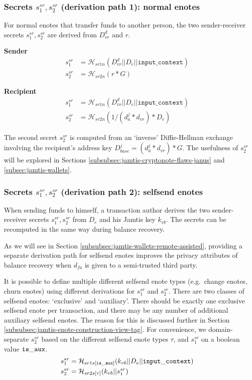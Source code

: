 \subsubsection{Secrets $s^{sr}_1, s^{sr}_2$ (derivation path 1): normal enotes}
\label{subsubsec:jamtis-srsecret-derivation-normal}

For normal enotes that transfer funds to another person, the two sender-receiver secrets $s^{sr}_1, s^{sr}_2$ are derived from $D^d_{vr}$ and $r$.

\textbf{Sender}
\begin{align*}
    s^{sr}_1 &= \mathcal{H}_{sr1n}(D^d_{vr} || D_e || \texttt{input\_context}) \\
    s^{sr}_2 &= \mathcal{H}_{sr2n}(r * G)
\end{align*}

\textbf{Recipient}
\begin{align*}
    s^{sr}_1 &= \mathcal{H}_{sr1n}(D^d_{vr} || D_e || \texttt{input\_context}) \\
    s^{sr}_2 &= \mathcal{H}_{sr2n}(1/(d^j_a * d_{vr}) * D_e)
\end{align*}

The second secret $s^{sr}_2$ is computed from an `inverse' Diffie-Hellman exchange involving the recipient's address key $D^j_{base} = (d^j_a * d_{vr}) * G$. The usefulness of $s^{sr}_2$ will be explored in Sections \ref{subsubsec:jamtis-cryptonote-flaws-janus} and \ref{subsec:jamtis-wallets}.

\subsubsection{Secrets $s^{sr}_1, s^{sr}_2$ (derivation path 2): selfsend enotes}
\label{subsubsec:jamtis-srsecret-derivation-selfsend}

When sending funds to himself, a transaction author derives the two sender-receiver secrets $s^{sr}_1, s^{sr}_2$ from $D_e$ and his Jamtis key $k_{vb}$. The secrets can be recomputed in the same way during balance recovery.

As we will see in Section \ref{subsubsec:jamtis-wallets-remote-assisted}, providing a separate derivation path for selfsend enotes improves the privacy attributes of balance recovery when $d_{fa}$ is given to a semi-trusted third party.

It is possible to define multiple different selfsend enote types (e.g.\ change enotes, churn enotes) using different derivations for $s^{sr}_1$ and $s^{sr}_2$. There are two classes of selfsend enotes: `exclusive' and `auxiliary'. There should be exactly one exclusive selfsend enote per transaction, and there may be any number of additional auxiliary selfsend enotes. The reason for this is discussed further in Section \ref{subsubsec:jamtis-enote-construction-view-tag}. For convenience, we domain-separate $s^{sr}_2$ based on the different selfsend enote types $\tau$, and $s^{sr}_1$ on a boolean value $\tt{is\_aux}$.
\begin{align*}
    s^{sr}_1 &= \mathcal{H}_{sr1s[\tt{is\_aux}]}(k_{vb} || D_e || {\tt input\_context}) \\
    s^{sr}_2 &= \mathcal{H}_{sr2s[\tau]}(k_{vb} || s^{sr}_1)
\end{align*}

